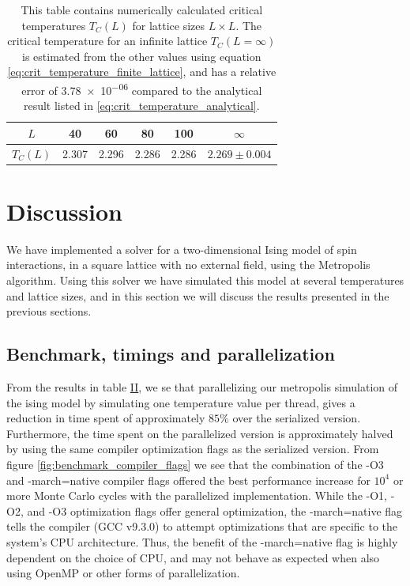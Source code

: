 \documentclass[reprint,english,notitlepage]{revtex4-1}  %
\begin{document}
\begin{table}[H]
\centering
\caption{This table contains numerically calculated critical temperatures $T_C(L)$ for lattice sizes $L \times L$. The critical temperature for an infinite lattice $T_C(L=\infty)$ is estimated from the other values using equation \eqref{eq:crit_temperature_finite_lattice}, and has a relative error of \num{3.78e-06} compared to the analytical result listed in \eqref{eq:crit_temperature_analytical}.} \label{table:crit_temps}
\begin{tabular}{|c|c|c|c|c|c|}
\hline
$L$ & 40 & 60 & 80 & 100 & $\infty$ \\
\hline
$T_C(L)$ & 2.307 & 2.296 & 2.286 & 2.286 & $2.269\pm 0.004$ \\
\hline
\end{tabular}
\end{table}


\newpage

\section{Discussion} \label{sec:V}

We have implemented a solver for a two-dimensional Ising model of spin interactions, in a square lattice with no external field, using the Metropolis algorithm. Using this solver we have simulated this model at several temperatures and lattice sizes, and in this section we will discuss the results presented in the previous sections.

\subsection{Benchmark, timings and parallelization} \label{sec:V:A}
From the results in table \hyperref[table:benchmark_parallel]{II}, we se that parallelizing our metropolis simulation of the ising model by simulating one temperature value per thread, gives a reduction in time spent of approximately \(85\%\) over the serialized version. Furthermore, the time spent on the parallelized version is approximately halved by using the same compiler optimization flags as the serialized version. From figure \ref{fig:benchmark_compiler_flags} we see that the combination of the -O3 and -march=native compiler flags offered the best performance increase for \(10^{4}\) or more Monte Carlo cycles with the parallelized implementation. While the -O1, -O2, and -O3 optimization flags offer general optimization, the -march=native flag tells the compiler (GCC v9.3.0) to attempt optimizations that are specific to the system's CPU architecture. Thus, the benefit of the -march=native flag is highly dependent on the choice of CPU, and may not behave as expected when also using OpenMP or other forms of parallelization.
\end{document}
